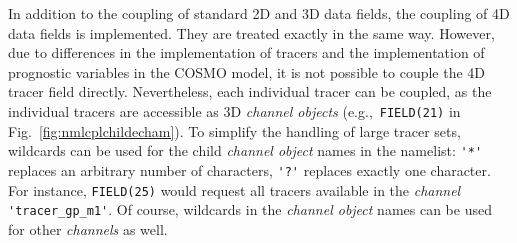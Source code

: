 \documentclass[11pt,twoside]{article}
\newcommand{\blockcode}{\ttfamily\color{OliveGreen}\par}
\begin{document}
In addition to the coupling of standard 2D and 3D data fields, the coupling of
4D data fields is implemented. They are treated exactly in the same way.
However, due to differences in the implementation of tracers \citep{Joeckel08a}
and the implementation of prognostic variables in the COSMO 
model, it is not possible to couple the 4D tracer field
 directly. Nevertheless, each 
individual tracer can be coupled, as the individual tracers are accessible
 as 3D {\it channel objects} (e.g.,\ \verb|FIELD(21)| in Fig.\ 
\ref{fig:nmlcplchildecham}). To simplify the handling of large tracer sets,
wildcards  
can be used for the child {\it channel object} names in the namelist: 
\verb|'*'| replaces an arbitrary number of characters, \verb|'?'|
replaces exactly one character. For instance, \verb|FIELD(25)| would request all
tracers available in the {\it channel} \verb|'tracer_gp_m1'|. Of course,
wildcards  
in the {\it channel object} names can be used for other {\it channels} as well.

\end{document}
